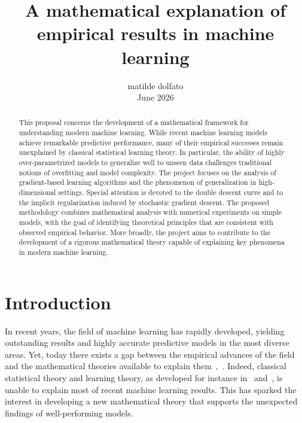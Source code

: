 \documentclass[reqno]{amsart}
\title{A mathematical explanation of empirical results in machine learning}
\author{matilde dolfato\\
June 2026}
\begin{document}
\begin{abstract}
This proposal concerns the development of a mathematical framework for understanding modern machine learning. While recent machine learning models achieve remarkable predictive performance, many of their empirical successes remain unexplained by classical statistical learning theory. In particular, the ability of highly over-parametrized models to generalize well to unseen data challenges traditional notions of overfitting and model complexity.
The project focuses on the analysis of gradient-based learning algorithms and the phenomenon of generalization in high-dimensional settings. Special attention is devoted to the double descent curve and to the implicit regularization induced by stochastic gradient descent. The proposed methodology combines mathematical analysis with numerical experiments on simple models, with the goal of identifying theoretical principles that are consistent with observed empirical behavior. More broadly, the project aims to contribute to the development of a rigorous mathematical theory capable of explaining key phenomena in modern machine learning.

\end{abstract}

\maketitle




\section{Introduction}

In recent years, the field of machine learning has rapidly developed, yielding outstanding results and highly accurate predictive models in the most diverse areas. Yet, today there exists a gap between the empirical advances of the field and the mathematical theories available to explain them~\cite{belkin},~\cite{berner}. Indeed, classical statistical theory and learning theory, as developed for instance in~\cite{hastie} and~\cite{wainwright}, is unable to explain most of recent machine learning results. This has sparked the interest in developing a new mathematical theory that supports the unexpected findings of well-performing models. 
\end{document}
